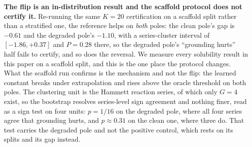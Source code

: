 \textbf{The flip is an in-distribution result and the scaffold protocol does
not certify it.} Re-running the same $K{=}20$ certification on a scaffold split rather than a
stratified one, the reference helps on \emph{both} poles: the clean pole's gap is $-0.61$ and the
degraded pole's $-1.10$, with a series-cluster interval of $[-1.86,+0.37]$ and $P=0.28$ there, so
the degraded pole's ``grounding hurts'' half fails to certify, and so does the reversal.
We measure every solubility result in this paper on a scaffold split, and this is the one place the
protocol changes. What the scaffold run confirms is the mechanism and not the flip: the learned
constant breaks under extrapolation and rises above the oracle threshold on both poles. The
clustering unit is the Hammett reaction series, of which only $G{=}4$ exist, so the bootstrap
resolves series-level sign agreement and nothing finer, read as a sign test on four units:
$p{=}1/16$ on the degraded pole, where all four series agree that grounding hurts, and
$p\approx0.31$ on the clean one, where three do. That test carries the degraded pole and not the
positive control, which rests on its splits and its gap instead.

